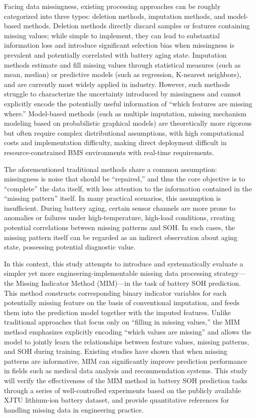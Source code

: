 \documentclass[10pt,a4paper]{article}
\begin{document}
Facing data missingness, existing processing approaches can be roughly categorized into three types: deletion methods, imputation methods, and model-based methods. Deletion methods directly discard samples or features containing missing values; while simple to implement, they can lead to substantial information loss and introduce significant selection bias when missingness is prevalent and potentially correlated with battery aging state. Imputation methods estimate and fill missing values through statistical measures (such as mean, median) or predictive models (such as regression, K-nearest neighbors), and are currently most widely applied in industry. However, such methods struggle to characterize the uncertainty introduced by missingness and cannot explicitly encode the potentially useful information of ``which features are missing where.'' Model-based methods (such as multiple imputation, missing mechanism modeling based on probabilistic graphical models) are theoretically more rigorous but often require complex distributional assumptions, with high computational costs and implementation difficulty, making direct deployment difficult in resource-constrained BMS environments with real-time requirements.

The aforementioned traditional methods share a common assumption: missingness is noise that should be ``repaired,'' and thus the core objective is to ``complete'' the data itself, with less attention to the information contained in the ``missing pattern'' itself. In many practical scenarios, this assumption is insufficient. During battery aging, certain sensor channels are more prone to anomalies or failures under high-temperature, high-load conditions, creating potential correlations between missing patterns and SOH. In such cases, the missing pattern itself can be regarded as an indirect observation about aging state, possessing potential diagnostic value.

In this context, this study attempts to introduce and systematically evaluate a simpler yet more engineering-implementable missing data processing strategy---the Missing Indicator Method (MIM)\cite{jones1996indicator,van2023missing}---in the task of battery SOH prediction. This method constructs corresponding binary indicator variables for each potentially missing feature on the basis of conventional imputation, and feeds them into the prediction model together with the imputed features. Unlike traditional approaches that focus only on ``filling in missing values,'' the MIM method emphasizes explicitly encoding ``which values are missing'' and allows the model to jointly learn the relationships between feature values, missing patterns, and SOH during training. Existing studies have shown that when missing patterns are informative, MIM can significantly improve prediction performance in fields such as medical data analysis and recommendation systems\cite{sisk2023imputation,ehrig2025imputation}. This study will verify the effectiveness of the MIM method in battery SOH prediction tasks through a series of well-controlled experiments based on the publicly available XJTU lithium-ion battery dataset, and provide quantitative references for handling missing data in engineering practice.
\end{document}
